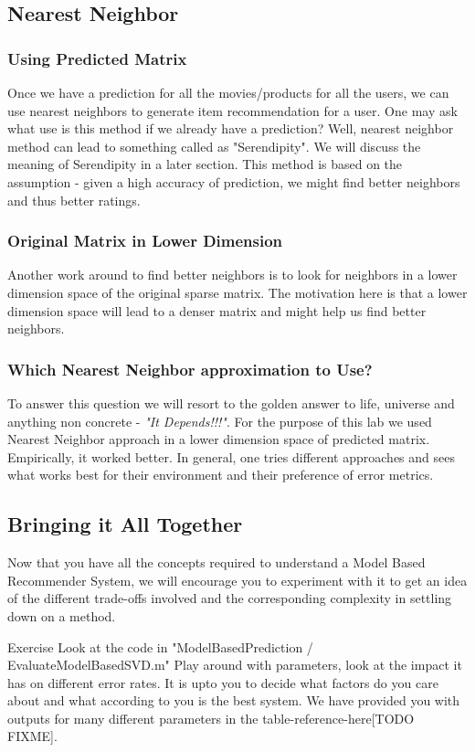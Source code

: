   \subsection{Nearest Neighbor}
  \subsubsection{Using Predicted Matrix}
  Once we have a prediction for all the movies/products for all the users, we can use nearest neighbors to generate item recommendation for a user. One may ask what use is this method if we already have a prediction? Well, nearest neighbor method can lead to something called as "Serendipity". We will discuss the meaning of Serendipity in a later section. This method is based on the assumption - given a high accuracy of prediction, we might find better neighbors and thus better ratings.
  \subsubsection{Original Matrix in Lower Dimension}
  Another work around to find better neighbors is to look for neighbors in a lower dimension space of the original sparse matrix. The motivation here is that a lower dimension space will lead to a denser matrix and might help us find better neighbors.
  \subsubsection{Which Nearest Neighbor approximation to Use?}
  To answer this question we will resort to the golden answer to life, universe and anything non concrete - \textit{"It Depends!!!"}. For the purpose of this lab we used Nearest Neighbor approach in a lower dimension space of predicted matrix. Empirically, it worked better. In general, one tries different approaches and sees what works best for their environment and their preference of error metrics.
  \subsection{Bringing it All Together}
  Now that you have all the concepts required to understand a Model Based Recommender System, we will encourage you to experiment with it to get an idea of the different trade-offs involved and the corresponding complexity in settling down on a method.
\begin{myremark}{Exercise }
Look at the code in "ModelBasedPrediction / EvaluateModelBasedSVD.m" Play around with parameters, look at the impact it has on different error rates. It is upto you to decide what factors do you care about and what according to you is the best system. We have provided you with outputs for many different parameters in the table-reference-here[TODO FIXME].
\end{myremark}
